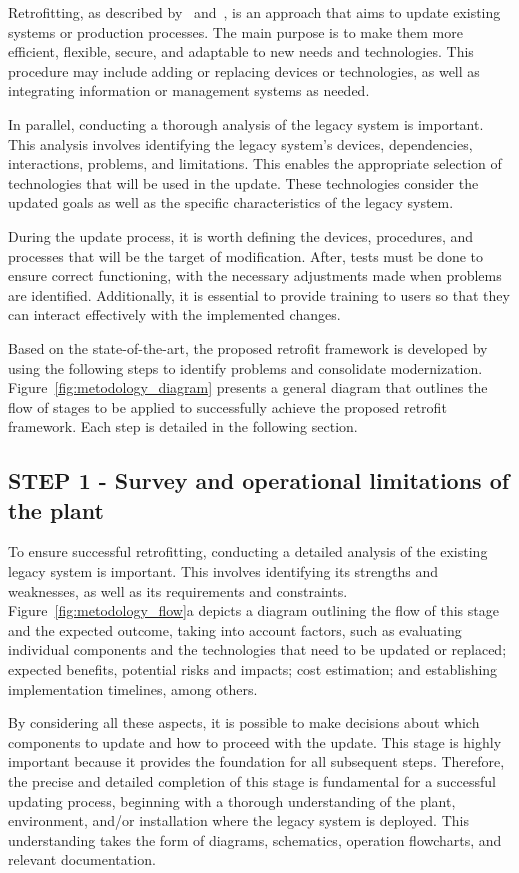 \documentclass[journal]{IEEEtran}
\begin{document}
Retrofitting, as described by~\cite{Garcia2020} and~\cite{Niemeyer2020}, is an approach that aims to update existing systems or production processes. The main purpose is to make them more efficient, flexible, secure, and adaptable to new needs and technologies. This procedure may include adding or replacing devices or technologies, as well as integrating information or management systems as needed.

In parallel, conducting a thorough analysis of the legacy system is important. This analysis involves identifying the legacy system's devices, dependencies, interactions, problems, and limitations. This enables the appropriate selection of technologies that will be used in the update. These technologies consider the updated goals as well as the specific characteristics of the legacy system.

During the update process, it is worth defining the devices, procedures, and processes that will be the target of modification. After, tests must be done to ensure correct functioning, with the necessary adjustments made when problems are identified. Additionally, it is essential to provide training to users so that they can interact effectively with the implemented changes.

Based on the state-of-the-art, the proposed retrofit framework is developed by using the following steps to identify problems and consolidate modernization. Figure~\ref{fig:metodology_diagram} presents a general diagram that outlines the flow of stages to be applied to successfully achieve the proposed retrofit framework. Each step is detailed in the following section. 

\subsection{STEP 1 - Survey and operational limitations of the plant} 

To ensure successful retrofitting, conducting a detailed analysis of the existing legacy system is important. This involves identifying its strengths and weaknesses, as well as its requirements and constraints. Figure~\ref{fig:metodology_flow}a depicts a diagram outlining the flow of this stage and the expected outcome, taking into account factors, such as evaluating individual components and the technologies that need to be updated or replaced; expected benefits, potential risks and impacts; cost estimation; and establishing implementation timelines, among others.

By considering all these aspects, it is possible to make decisions about which components to update and how to proceed with the update. This stage is highly important because it provides the foundation for all subsequent steps. Therefore, the precise and detailed completion of this stage is fundamental for a successful updating process, beginning with a thorough understanding of the plant, environment, and/or installation where the legacy system is deployed. This understanding takes the form of diagrams, schematics, operation flowcharts, and relevant documentation.
\end{document}
